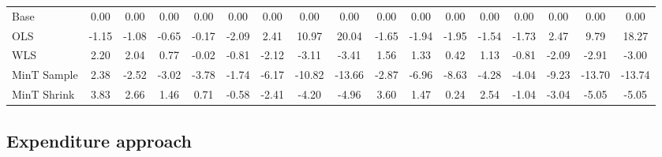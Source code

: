 \documentclass[graybox]{svmult}
\begin{document}
\begin{table}[H]
{\begin{tabular}{@{}lSSSSSSSSSSSSSSSS@{}}
			Base & 0.00 & 0.00 & 0.00 & 0.00 & 0.00 & 0.00 & 0.00 & 0.00 & 0.00 & 0.00 & 0.00 & 0.00 & 0.00 & 0.00 & 0.00 & 0.00\\
			
			OLS & -1.15 & -1.08 & -0.65 & -0.17 & -2.09 & 2.41 & 10.97 & 20.04 & -1.65 & -1.94 & -1.95 & -1.54 & -1.73 & 2.47 & 9.79 & 18.27\\
			
			WLS & 2.20 & 2.04 & 0.77 & -0.02 & -0.81 & -2.12 & -3.11 & -3.41 & 1.56 & 1.33 & 0.42 & 1.13 & -0.81 & -2.09 & -2.91 & -3.00\\
			
			MinT Sample & 2.38 & -2.52 & -3.02 & -3.78 & -1.74 & -6.17 & -10.82 & -13.66 & -2.87 & -6.96 & -8.63 & -4.28 & -4.04 & -9.23 & -13.70 & -13.74\\
			
			MinT Shrink & 3.83 & 2.66 & 1.46 & 0.71 & -0.58 & -2.41 & -4.20 & -4.96 & 3.60 & 1.47 & 0.24 & 2.54 & -1.04 & -3.04 & -5.05 & -5.05\\
			\bottomrule
			
		\end{tabular}
	 \label{Tab: Inc_ProbGaus_UnivS}
	}
\end{table}

\subsection*{Expenditure approach}
\end{document}
